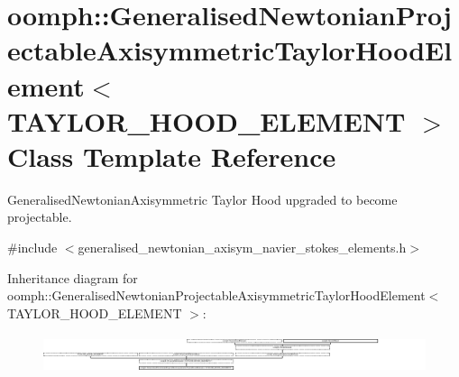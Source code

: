 \hypertarget{classoomph_1_1GeneralisedNewtonianProjectableAxisymmetricTaylorHoodElement}{}\section{oomph\+:\+:Generalised\+Newtonian\+Projectable\+Axisymmetric\+Taylor\+Hood\+Element$<$ T\+A\+Y\+L\+O\+R\+\_\+\+H\+O\+O\+D\+\_\+\+E\+L\+E\+M\+E\+NT $>$ Class Template Reference}
\label{classoomph_1_1GeneralisedNewtonianProjectableAxisymmetricTaylorHoodElement}


Generalised\+Newtonian\+Axisymmetric Taylor Hood upgraded to become projectable.  




{\ttfamily \#include $<$generalised\+\_\+newtonian\+\_\+axisym\+\_\+navier\+\_\+stokes\+\_\+elements.\+h$>$}

Inheritance diagram for oomph\+:\+:Generalised\+Newtonian\+Projectable\+Axisymmetric\+Taylor\+Hood\+Element$<$ T\+A\+Y\+L\+O\+R\+\_\+\+H\+O\+O\+D\+\_\+\+E\+L\+E\+M\+E\+NT $>$\+:\begin{figure}[H]
\begin{center}
\leavevmode
\includegraphics[height=1.125402cm]{classoomph_1_1GeneralisedNewtonianProjectableAxisymmetricTaylorHoodElement}
\end{center}
\end{figure}
